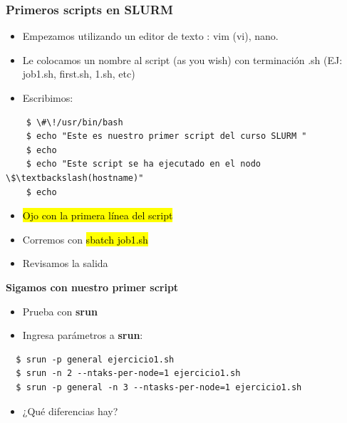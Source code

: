 \documentclass[aspectratio=169,professionalfonts]{beamer}
\begin{document}
\begin{frame}[fragile]
\frametitle{\textbf{Primeros scripts en SLURM}}
\begin{itemize}
    \item Empezamos utilizando un editor de texto : vim (vi), nano. 
    \item Le colocamos un nombre al script (as you wish) con terminación .sh (EJ: job1.sh, first.sh, 1.sh, etc)
    \item Escribimos:
\end{itemize}

\begin{verbatim}
    $ \#\!/usr/bin/bash
    $ echo "Este es nuestro primer script del curso SLURM "
    $ echo
    $ echo "Este script se ha ejecutado en el nodo \$\textbackslash(hostname)"
    $ echo 
\end{verbatim}


    \begin{itemize}
        \item \hl{Ojo con la primera línea del script}
        \item Corremos con \hl{sbatch job1.sh}
        \item Revisamos la salida 
    \end{itemize}
    \end{frame}

\begin{frame}[fragile]
{\textbf{Sigamos con nuestro primer script}}
\begin{itemize}
    \item Prueba con \textbf{srun}\vspace{0.5em}
    \vspace{0.5em}
    \item Ingresa parámetros a \textbf{srun}:
    \vspace{0.5em}
   \end{itemize} 



  \begin{verbatim}
  $ srun -p general ejercicio1.sh
  $ srun -n 2 --ntaks-per-node=1 ejercicio1.sh
  $ srun -p general -n 3 --ntasks-per-node=1 ejercicio1.sh
  \end{verbatim} 
  \vspace{0.5em}
    \begin{itemize}
        \item ¿Qué diferencias hay?
    \end{itemize}
    \end{frame}
\end{document}
